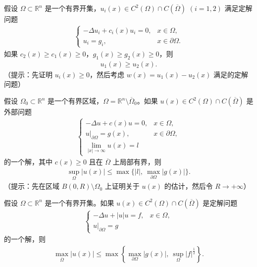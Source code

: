 \documentclass[../../main.tex]{subfiles}%
\begin{document}
\begin{example}
假设 $\Omega\subset\mathbb{R}^n$ 是一个有界开集，$u_i(x)\in C^2(\Omega)\cap C(\overline{\Omega})$ $(i=1,2)$ 满足定解问题
\begin{align*}
\begin{cases}
-\Delta u_i + c_i(x)u_i = 0, & x\in\Omega, \\
u_i = g_i, & x\in\partial\Omega.
\end{cases}
\end{align*}
如果 $c_2(x)\geqslant c_1(x)\geqslant 0$，$g_1(x)\geqslant g_2(x)\geqslant 0$，则
\begin{align*}
u_1(x)\geqslant u_2(x).
\end{align*}
（提示：先证明 $u_i(x)\geqslant 0$，然后考虑 $w(x)=u_1(x)-u_2(x)$ 满足的定解问题）
\end{example}

\begin{example}
假设 $\Omega_0\subset\mathbb{R}^n$ 是一个有界区域，$\Omega=\mathbb{R}^n\setminus\overline{\Omega}_0$。如果 $u(x)\in C^2(\Omega)\cap C(\overline{\Omega})$ 是外部问题
\begin{align*}
\begin{cases}
-\Delta u + c(x)u = 0, & x\in\Omega, \\
u|_{\partial\Omega} = g(x), & x\in\partial\Omega, \\
\lim_{|x|\to\infty} u(x) = l
\end{cases}
\end{align*}
的一个解，其中 $c(x)\geqslant 0$ 且在 $\overline{\Omega}$ 上局部有界，则
\begin{align*}
\sup_{\Omega} |u(x)| \leqslant \max\{|l|,\ \max_{\partial\Omega}|g(x)|\}.
\end{align*}
（提示：先在区域 $B(0,R)\setminus\Omega_0$ 上证明关于 $u(x)$ 的估计，然后令 $R\to+\infty$）
\end{example}

\begin{example}
假设 $\Omega\subset\mathbb{R}^n$ 是一个有界开集。如果 $u(x)\in C^2(\Omega)\cap C(\overline{\Omega})$ 是定解问题
\begin{align*}
\begin{cases}
-\Delta u + |u|u = f, & x\in\Omega, \\
u|_{\partial\Omega} = g
\end{cases}
\end{align*}
的一个解，则
\begin{align*}
\max_{\overline{\Omega}} |u(x)| \leqslant \max\left\{ \max_{\partial\Omega}|g(x)|,\ \sup_{\Omega}|f|^{\frac{1}{2}} \right\}.
\end{align*}
\end{example}
\end{document}
